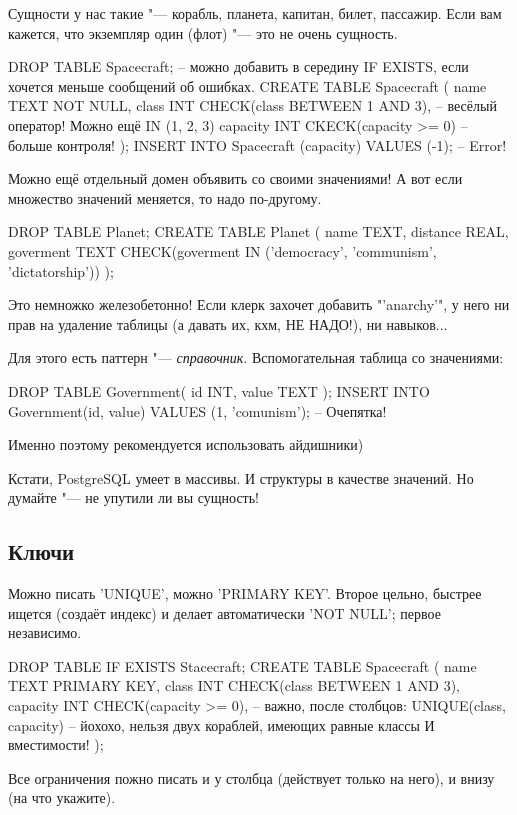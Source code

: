Сущности у нас такие "--- корабль, планета, капитан, билет, пассажир. Если вам кажется, что экземпляр один (флот) "--- это не очень сущность.
\begin{sqlcode}
DROP TABLE Spacecraft;
-- можно добавить в середину IF EXISTS, если хочется меньше сообщений об ошибках.
CREATE TABLE Spacecraft (
	name TEXT NOT NULL,
	class INT CHECK(class BETWEEN 1 AND 3), -- весёлый оператор! Можно ещё IN (1, 2, 3)
	capacity INT CKECK(capacity >= 0) -- больше контроля!
);
INSERT INTO Spacecraft (capacity) VALUES (-1); -- Error!
\end{sqlcode}
Можно ещё отдельный домен объявить со своими значениями!
А вот если множество значений меняется, то надо по-другому.
\begin{sqlcode}
DROP TABLE Planet; CREATE TABLE Planet (
	name TEXT,
	distance REAL,
	goverment TEXT CHECK(goverment IN ('democracy', 'communism', 'dictatorship'))
);
\end{sqlcode}
Это немножко железобетонно! Если клерк захочет добавить \sql"'anarchy'", у него ни прав на удаление таблицы (а давать их, кхм, НЕ НАДО!),
ни навыков...

Для этого есть паттерн "--- \textit{справочник}.
Вспомогательная таблица со значениями:
\begin{sqlcode}
DROP TABLE Government(
	id INT,
	value TEXT
);
INSERT INTO Government(id, value) VALUES (1, 'comunism'); -- Очепятка!
\end{sqlcode}
Именно поэтому рекомендуется использовать айдишники)

Кстати, PostgreSQL умеет в массивы.
И структуры в качестве значений.
Но думайте "--- не упутили ли вы сущность!

\subsection{Ключи}

Можно писать \sql'UNIQUE', можно \sql'PRIMARY KEY'.
Второе цельно, быстрее ищется (создаёт индекс) и делает автоматически \sql'NOT NULL'; первое независимо.
\begin{sqlcode}
DROP TABLE IF EXISTS Stacecraft;
CREATE TABLE Spacecraft (
	name TEXT PRIMARY KEY,
	class INT CHECK(class BETWEEN 1 AND 3),
	capacity INT CHECK(capacity >= 0),
	-- важно, после столбцов:
	UNIQUE(class, capacity)
	-- йохохо, нельзя двух кораблей, имеющих равные классы И вместимости!
);
\end{sqlcode}
Все ограничения пожно писать и у столбца (действует только на него), и внизу (на что укажите).

